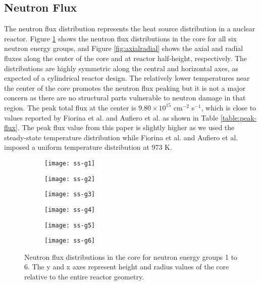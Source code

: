 \subsection{Neutron Flux}

The neutron flux distribution represents the heat source distribution in a
nuclear reactor. Figure \ref{fig:neutronflux} shows the neutron flux
distributions in the core for all six neutron energy groups, and Figure
\ref{fig:axialradial} shows the axial and radial fluxes along the center of
the core and at reactor half-height, respectively.
The distributions are highly symmetric along the
central and horizontal axes, as expected of a cylindrical reactor design. The
relatively lower temperatures near the center of the core promotes the neutron
flux peaking but it is not a major concern as there are no structural parts
vulnerable to neutron damage in that region. The peak total flux at the center
is $9.80 \times 10^{15}$ cm$^{-2}$ s$^{-1}$, which is close to values reported
by Fiorina et al. \cite{fiorina_molten_2013} and Aufiero et al.
\cite{aufiero_development_2014} as shown in Table \ref{table:peak-flux}. The
peak flux value from this paper is slightly higher as we used the steady-state
temperature distribution while Fiorina et al. and Aufiero et al. imposed a
uniform temperature distribution at 973 K.

\begin{figure}[t!]
    \centering
    \begin{subfigure}[t]{.325\textwidth}
        \centering
        \texttt{[image: ss-g1]}
    \end{subfigure}
    \begin{subfigure}[t]{.325\textwidth}
        \centering
        \texttt{[image: ss-g2]}
    \end{subfigure}
    \begin{subfigure}[t]{.325\textwidth}
        \centering
        \texttt{[image: ss-g3]}
    \end{subfigure}
    \begin{subfigure}[t]{.325\textwidth}
        \centering
        \texttt{[image: ss-g4]}
    \end{subfigure}
    \begin{subfigure}[t]{.325\textwidth}
        \centering
        \texttt{[image: ss-g5]}
    \end{subfigure}
    \begin{subfigure}[t]{.325\textwidth}
        \centering
        \texttt{[image: ss-g6]}
    \end{subfigure}
    \caption{Neutron flux distributions in the core for neutron energy groups
    1 to 6. The y and x axes represent height and radius values of the core
    relative to the entire reactor geometry.}
    \label{fig:neutronflux}
\end{figure}

